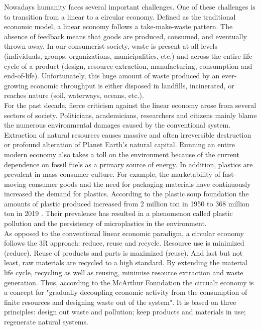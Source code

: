 \noindent Nowadays humanity faces several important challenges. One of these challenges is to transition from a linear to a circular economy. Defined as the traditional economic model, a linear economy follows a take-make-waste pattern. The absence of feedback means that goods are produced, consumed, and eventually thrown away. In our consumerist society, waste is present at all levels (individuals, groups, organizations, municipalities, etc.) and across the entire life cycle of a product (design, resource extraction, manufacturing, consumption and end-of-life). Unfortunately, this huge amount of waste produced by an ever-growing economic throughput is either disposed in landfills, incinerated, or reaches nature (soil, waterways, oceans, etc.).\\ 

\noindent For the past decade, fierce criticism against the linear economy arose from several sectors of society. Politicians, academicians, researchers and citizens mainly blame the numerous environmental damages caused by the conventional system. Extraction of natural resources causes massive and often irreversible destruction or profound alteration of Planet Earth's natural capital. Running an entire modern economy also takes a toll on the environment because of the current dependence on fossil fuels as a primary source of energy. In addition, plastics are prevalent in mass consumer culture. For example, the marketability of fast-moving consumer goods and the need for packaging materials have continuously increased the demand for plastics. According to the plastic soup foundation the amounts of plastic produced increased from 2 million ton in 1950 to 368 million ton in 2019 \cite{Plasticsoupfoundation2021}. Their prevalence has resulted in a phenomenon called plastic pollution and the persistency of microplastics in the environment.\\

\noindent As opposed to the conventional linear economic paradigm, a circular economy follows the 3R approach: reduce, reuse and recycle. Resource use is minimized (reduce). Reuse of products and parts is maximized (reuse). And last but not least, raw materials are recycled to a high standard. By extending the material life cycle, recycling as well as reusing, minimise resource extraction and waste generation. Thus, according to the McArthur Foundation the circualr economy is a concept for "gradually decoupling economic activity from the consumption of finite resources and designing waste out of the system". It is based on three principles: design out waste and pollution; keep products and materials in use; regenerate natural systems.\\

